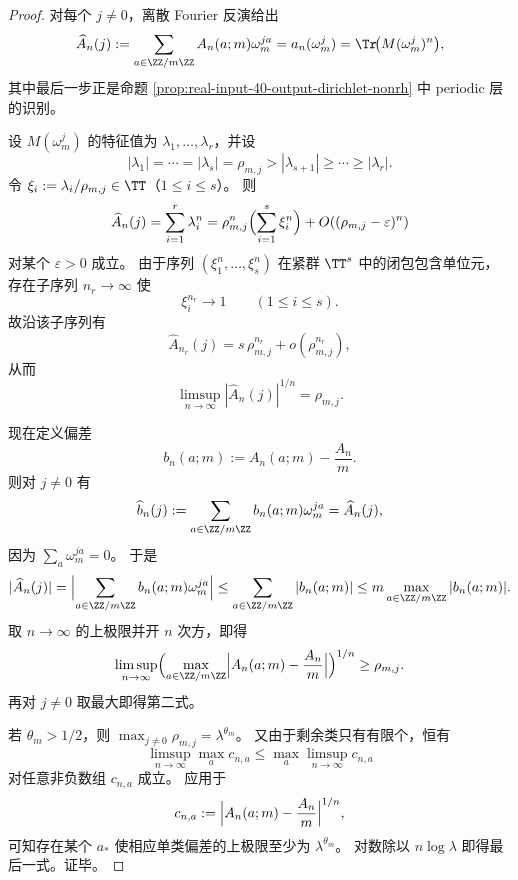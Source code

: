 \begin{proof}
对每个 \(j\neq 0\)，离散 Fourier 反演给出
\[
\widehat A_n(j)
:=
\sum_{a\in\ZZ/m\ZZ}A_n(a;m)\omega_m^{ja}
=
a_n(\omega_m^j)
=
\Tr\!\bigl(M(\omega_m^j)^n\bigr),
\]
其中最后一步正是命题 \ref{prop:real-input-40-output-dirichlet-nonrh} 中 periodic 层的识别。

设 \(M(\omega_m^j)\) 的特征值为 \(\lambda_1,\dots,\lambda_r\)，并设
\[
|\lambda_1|=\cdots=|\lambda_s|=\rho_{m,j}>|\lambda_{s+1}|\ge \cdots \ge |\lambda_r|.
\]
令 \(\xi_i:=\lambda_i/\rho_{m,j}\in\TT\)（\(1\le i\le s\)）。
则
\[
\widehat A_n(j)
=
\sum_{i=1}^{r}\lambda_i^n
=
\rho_{m,j}^n\Bigl(\sum_{i=1}^{s}\xi_i^n\Bigr)+O((\rho_{m,j}-\varepsilon)^n)
\]
对某个 \(\varepsilon>0\) 成立。
由于序列 \((\xi_1^n,\dots,\xi_s^n)\) 在紧群 \(\TT^s\) 中的闭包包含单位元，存在子序列 \(n_r\to\infty\) 使
\[
\xi_i^{n_r}\to 1
\qquad(1\le i\le s).
\]
故沿该子序列有
\[
\widehat A_{n_r}(j)=s\,\rho_{m,j}^{n_r}+o(\rho_{m,j}^{n_r}),
\]
从而
\[
\limsup_{n\to\infty}|\widehat A_n(j)|^{1/n}=\rho_{m,j}.
\]

现在定义偏差
\[
b_n(a;m):=A_n(a;m)-\frac{A_n}{m}.
\]
则对 \(j\neq 0\) 有
\[
\widehat b_n(j)
:=
\sum_{a\in\ZZ/m\ZZ}b_n(a;m)\omega_m^{ja}
=
\widehat A_n(j),
\]
因为 \(\sum_a \omega_m^{ja}=0\)。
于是
\[
|\widehat A_n(j)|
=
\Bigl|\sum_{a\in\ZZ/m\ZZ}b_n(a;m)\omega_m^{ja}\Bigr|
\le
\sum_{a\in\ZZ/m\ZZ}|b_n(a;m)|
\le
m\max_{a\in\ZZ/m\ZZ}|b_n(a;m)|.
\]
取 \(n\to\infty\) 的上极限并开 \(n\) 次方，即得
\[
\limsup_{n\to\infty}
\Bigl(
\max_{a\in\ZZ/m\ZZ}\Bigl|A_n(a;m)-\frac{A_n}{m}\Bigr|
\Bigr)^{1/n}
\ge
\rho_{m,j}.
\]
再对 \(j\neq 0\) 取最大即得第二式。

若 \(\theta_m>1/2\)，则 \(\max_{j\neq 0}\rho_{m,j}=\lambda^{\theta_m}\)。
又由于剩余类只有有限个，恒有
\[
\limsup_{n\to\infty}\max_{a} c_{n,a}\le \max_{a}\limsup_{n\to\infty} c_{n,a}
\]
对任意非负数组 \(c_{n,a}\) 成立。
应用于
\[
c_{n,a}:=\Bigl|A_n(a;m)-\frac{A_n}{m}\Bigr|^{1/n},
\]
可知存在某个 \(a_\ast\) 使相应单类偏差的上极限至少为 \(\lambda^{\theta_m}\)。
对数除以 \(n\log\lambda\) 即得最后一式。证毕。
\end{proof}





